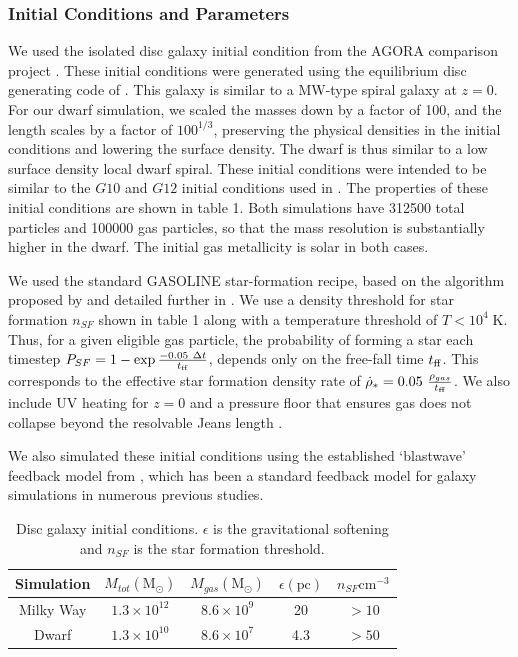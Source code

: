 \subsubsection{Initial Conditions and Parameters}
We used the isolated disc galaxy initial condition from the AGORA comparison
project \citep{Kim2013}.  These initial conditions were generated using the
equilibrium disc generating code of \citet{Springel2005}.
This galaxy is similar to a MW-type spiral galaxy
at $z=0$.  For our dwarf simulation, we scaled the masses down by a factor of
100, and the length scales by a factor of $100^{1/3}$, preserving the physical
densities in the initial conditions and lowering the surface density.  The dwarf
is thus similar to a low surface density local dwarf spiral.  These initial
conditions were intended to be similar to the $G10$ and $G12$ initial conditions
used in \citet{DallaVecchia2012}. The properties of these initial conditions are
shown in table 1.  Both simulations have 312500 total particles and 100000 gas
particles, so that the mass resolution is substantially higher in the dwarf.  The
initial gas metallicity is solar in both cases.

We used the standard {\sc GASOLINE} star-formation recipe, based on the
algorithm proposed by \citet{Katz1992} and detailed further in
\citet{Stinson2006}.  We use a density threshold for star formation $n_{SF}$
shown in table 1 along with a temperature threshold of $T < 10^4\;\mathrm{K}$.
Thus, for a given eligible gas particle, the probability of forming a star each
timestep $P_{SF} = 1-\exp{-0.05\ \Delta t\over t_{\rm ff}}$, depends only on the
free-fall time $t_{\rm ff}$.  This corresponds to the effective star formation
density rate of $\dot \rho_* = 0.05\ \frac{\rho_{gas}}{t_{\rm ff}}$.  We also
include UV heating for $z=0$ \citep[as in][]{Shen2010} and a pressure floor that
ensures gas does not collapse beyond the resolvable Jeans length
\citep{Machacek2001}.  

We also simulated these initial conditions using the established `blastwave'
feedback model from \citep{Stinson2006}, which has been a standard feedback
model for galaxy simulations in numerous previous studies.
\begin{table}
    \begin{tabular}{ c c c c c}
        \hline
        Simulation & $M_{tot} \mathrm{(M_\odot)}$ & $M_{gas} \mathrm{(M_\odot)}$
        & $\epsilon \mathrm{(pc)}$ & $n_{SF} \mathrm{cm^{-3}}$\\
        \hline
        Milky Way & $1.3\times10^{12}$ & $8.6\times10^9$ & 20  & $>10$\\
        Dwarf & $1.3\times10^{10}$ &  $8.6\times10^7$ & 4.3 & $>50$\\
    \end{tabular}
    \caption[Isolated Disc Initial Conditions]{Disc galaxy initial conditions.  $\epsilon$ is the gravitational
    softening and $n_{SF}$ is the star formation threshold.}
\end{table}

